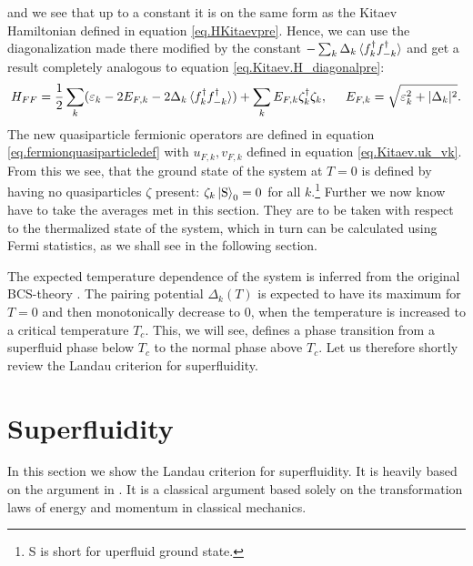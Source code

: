 and we see that up to a constant it is on the same form as the Kitaev Hamiltonian defined in equation \eqref{eq.HKitaevpre}. Hence, we can use the diagonalization made there modified by the constant $-\sum_k \Delta_k\braket {f^\dagger_k f^\dagger_{-k}} $ and get a result completely analogous to equation \eqref{eq.Kitaev.H_diagonalpre}: 
\begin{equation}
H_{FF} = \frac{1}{2}\sum_k (\varepsilon_k-2E_{F,k}-2\Delta_k\braket {f^\dagger_k f^\dagger_{-k}}) + \sum_k E_{F,k} \zeta^\dagger_k \zeta_k, \hspace{0.5cm} E_{F,k} = \sqrt{\varepsilon_k^2 + |\Delta_k|^2}.
\label{eq.Kitaev.HFF_diagonal}
\end{equation}
The new quasiparticle fermionic operators are defined in equation \eqref{eq.fermionquasiparticledef} with $u_{F,k},v_{F,k}$ defined in equation \eqref{eq.Kitaev.uk_vk}. From this we see, that the ground state of the system at $T=0$ is defined by having no quasiparticles $\zeta$ present: $\zeta_k \ket{\text{S}}_0 = 0$ for all $k$.\footnote{S is short for uperfluid ground state.} Further we now know have to take the averages met in this section. They are to be taken with respect to the thermalized state of the system, which in turn can be calculated using Fermi statistics, as we shall see in the following section. 

The expected temperature dependence of the system is inferred from the original BCS-theory \cite{Tinkham,LandauStatPhys2,PlischkeStatPhys}. The pairing potential $\Delta_k(T)$ is expected to have its maximum for $T = 0$ and then monotonically decrease to 0, when the temperature is increased to a critical temperature $T_c$. This, we will see, defines a phase transition from a superfluid phase below $T_c$ to the normal phase above $T_c$. Let us therefore shortly review the Landau criterion for superfluidity. 


\section{Superfluidity} \label{sec.Superfluidity}
In this section we show the Landau criterion for superfluidity. It is heavily based on the argument in \cite{LandauStatPhys2}. It is a classical argument based solely on the transformation laws of energy and momentum in classical mechanics. 

